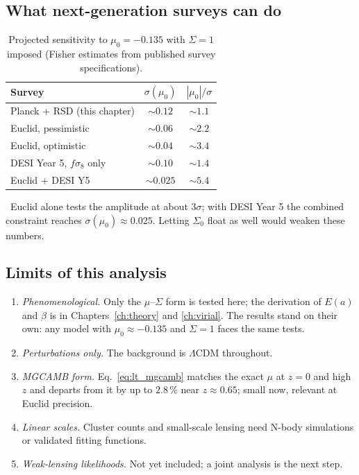 \subsection{What next-generation surveys can do}
\begin{table}[h]\centering\small
\caption{Projected sensitivity to $\mu_0=-0.135$ with $\Sigma=1$ imposed (Fisher estimates from published survey specifications).}\label{tab:lt_forecast}
\begin{tabular}{lcc}\hline
Survey & $\sigma(\mu_0)$ & $|\mu_0|/\sigma$\\\hline
Planck + RSD (this chapter) & $\sim0.12$ & $\sim1.1$\\
Euclid, pessimistic & $\sim0.06$ & $\sim2.2$\\
Euclid, optimistic & $\sim0.04$ & $\sim3.4$\\
DESI Year 5, $f\sigma_8$ only & $\sim0.10$ & $\sim1.4$\\
Euclid + DESI Y5 & $\sim0.025$ & $\sim5.4$\\\hline
\end{tabular}\end{table}
\prediction\ Euclid alone tests the amplitude at about $3\sigma$; with DESI Year 5 the combined constraint reaches $\sigma(\mu_0)\approx0.025$. Letting $\Sigma_0$ float as
well would weaken these numbers.

\subsection{Limits of this analysis}
\begin{enumerate}
\item \emph{Phenomenological.} Only the $\mu$--$\Sigma$ form is tested here; the derivation of $E(a)$ and $\beta$ is in Chapters~\ref{ch:theory} and \ref{ch:virial}.
The results stand on their own: any model with $\mu_0\approx-0.135$ and $\Sigma=1$ faces the same tests.
\item \emph{Perturbations only.} The background is $\Lambda$CDM throughout.
\item \emph{MGCAMB form.} Eq.~\eqref{eq:lt_mgcamb} matches the exact $\mu$ at $z=0$ and high $z$ and departs from it by up to $2.8\,\%$ near $z\approx0.65$; small now,
relevant at Euclid precision.
\item \emph{Linear scales.} Cluster counts and small-scale lensing need N-body simulations or validated fitting functions.
\item \emph{Weak-lensing likelihoods.} Not yet included; a joint analysis is the next step.
\end{enumerate}

